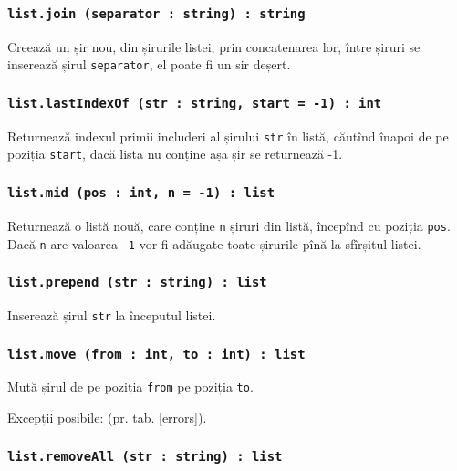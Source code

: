 \subsubsection{\texttt{list.join (separator : string) : string}}

Creează un șir nou, din șirurile listei, prin concatenarea lor, între șiruri se inserează șirul \texttt{separator}, el poate fi un sir deșert.

\subsubsection{\texttt{list.lastIndexOf (str : string, start = -1) : int}}

Returnează indexul primii includeri al șirului \texttt{str} în listă, căutînd înapoi de pe poziția \texttt{start}, dacă lista nu conține așa șir se returnează -1.

\subsubsection{\texttt{list.mid (pos : int, n = -1) : list}}

Returnează o listă nouă, care conține \texttt{n} șiruri din listă, începînd cu poziția \texttt{pos}. Dacă \texttt{n} are valoarea \texttt{-1} vor fi adăugate toate șirurile pînă la sfîrșitul listei.

\subsubsection{\texttt{list.prepend (str : string) : list}}

Inserează șirul \texttt{str} la începutul listei.

\subsubsection{\texttt{list.move (from : int, to : int) : list}}

Mută șirul de pe poziția \texttt{from} pe poziția \texttt{to}.

Excepții posibile:  (pr. tab. \ref{errors}).

\subsubsection{\texttt{list.removeAll (str : string) : list}}

